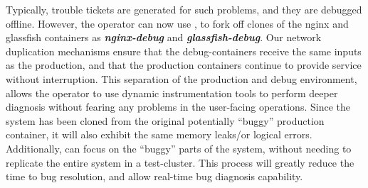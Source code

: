 Typically, trouble tickets are generated for such problems, and they are debugged offline.
However, the operator can now use \parikshan, to fork off clones of the nginx and glassfish containers as \textbf{\textit{nginx-debug}} and \textbf{\textit{glassfish-debug}}.
Our network duplication mechanisms ensure that the debug-containers receive the same inputs as the production, and that the production containers continue to provide service without interruption.
This separation of the production and debug environment, allows the operator to use dynamic instrumentation tools to perform deeper diagnosis without fearing any problems in the user-facing operations.
Since the system has been cloned from the original potentially ``buggy'' production container, it will also exhibit the same memory leaks/or logical errors.
Additionally, \parikshan can focus on the ``buggy'' parts of the system, without needing to replicate the entire system in a test-cluster.
This process will greatly reduce the time to bug resolution, and allow real-time bug diagnosis capability.

